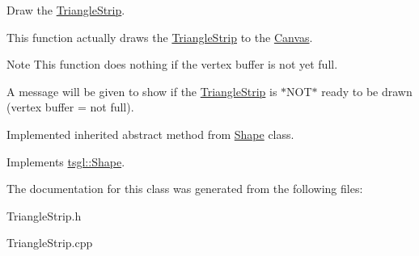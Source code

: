 \-Draw the \hyperlink{classtsgl_1_1_triangle_strip}{\-Triangle\-Strip}. 

\-This function actually draws the \hyperlink{classtsgl_1_1_triangle_strip}{\-Triangle\-Strip} to the \hyperlink{classtsgl_1_1_canvas}{\-Canvas}. \begin{DoxyNote}{\-Note}
\-This function does nothing if the vertex buffer is not yet full. 

\-A message will be given to show if the \hyperlink{classtsgl_1_1_triangle_strip}{\-Triangle\-Strip} is $\ast$\-N\-O\-T$\ast$ ready to be drawn (vertex buffer = not full). 

\-Implemented inherited abstract method from \hyperlink{classtsgl_1_1_shape}{\-Shape} class. 
\end{DoxyNote}


\-Implements \hyperlink{classtsgl_1_1_shape_af78b1627b97d621824ce86db214e2402}{tsgl\-::\-Shape}.



\-The documentation for this class was generated from the following files\-:\begin{DoxyCompactItemize}
\item 
\-Triangle\-Strip.\-h\item 
\-Triangle\-Strip.\-cpp\end{DoxyCompactItemize}
